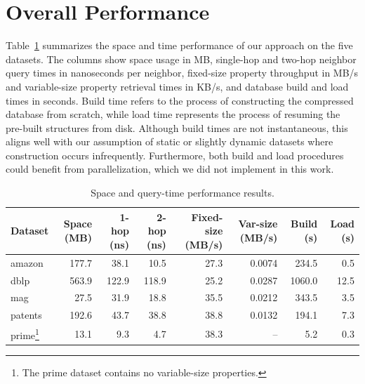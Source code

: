 \section{Overall Performance}

Table~\ref{tab:results} summarizes the space and time performance of our approach on the five datasets. The columns show space usage in MB, single-hop and two-hop neighbor query times in nanoseconds per neighbor, fixed-size property throughput in MB/s and variable-size property retrieval times in KB/s, and database build and load times in seconds. Build time refers to the process of constructing the compressed database from scratch, while load time represents the process of resuming the pre-built structures from disk. Although build times are not instantaneous, this aligns well with our assumption of static or slightly dynamic datasets where construction occurs infrequently. Furthermore, both build and load procedures could benefit from parallelization, which we did not implement in this work.

\begin{table}[htbp]
\centering
\tiny
\caption{Space and query-time performance results.}
\label{tab:results}
\begin{tabularx}{\textwidth}{lrrrrrrr}
\toprule
Dataset & Space (MB) & 1-hop (ns) & 2-hop (ns) & Fixed-size (MB/s) & Var-size (MB/s) & Build (s) & Load (s) \\
\midrule
amazon   & 177.7 &  38.1 &  10.5 & 27.3 & 0.0074 & 234.5 & 0.5 \\
dblp     & 563.9 & 122.9 & 118.9 & 25.2 & 0.0287 & 1060.0 & 12.5 \\
mag      &  27.5 &  31.9 &  18.8 & 35.5 & 0.0212 & 343.5 & 3.5 \\
patents  & 192.6 &  43.7 &  38.8 & 38.8 & 0.0132 & 194.1 & 7.3 \\
prime\footnote{The prime dataset contains no variable-size properties.}
         &  13.1 &   9.3 &   4.7 & 38.3 & -- & 5.2 & 0.3 \\
\bottomrule
\end{tabularx}
\end{table}
\FloatBarrier

